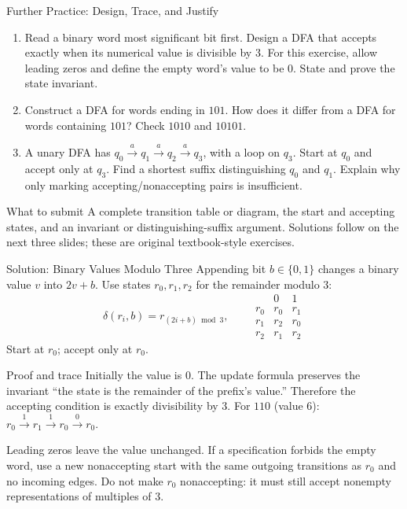\documentclass[10pt]{beamer}
\begin{document}
\begin{frame}{Further Practice: Design, Trace, and Justify}
  \small
  \begin{enumerate}
    \item Read a binary word most significant bit first. Design a DFA that
      accepts exactly when its numerical value is divisible by $3$.
      For this exercise, allow leading zeros and define the empty word's
      value to be $0$. State and prove the state invariant.
    \pause
    \item Construct a DFA for words ending in $101$. How does it differ
      from a DFA for words containing $101$? Check $1010$ and $10101$.
    \pause
    \item A unary DFA has $q_0\xrightarrow{a}q_1\xrightarrow{a}q_2
      \xrightarrow{a}q_3$, with a loop on $q_3$. Start at $q_0$ and accept
      only at $q_3$. Find a shortest suffix distinguishing $q_0$ and $q_1$.
      Explain why only marking accepting/nonaccepting pairs is insufficient.
  \end{enumerate}
  \begin{block}{What to submit}
    A complete transition table or diagram, the start and accepting states,
    and an invariant or distinguishing-suffix argument. Solutions follow on
    the next three slides; these are original textbook-style exercises.
  \end{block}
\end{frame}

\begin{frame}{Solution: Binary Values Modulo Three}
  \small
  Appending bit $b\in\{0,1\}$ changes a binary value $v$ into $2v+b$.
  Use states $r_0,r_1,r_2$ for the remainder modulo $3$:
  \[
    \delta(r_i,b)=r_{(2i+b)\bmod3},\qquad
    \begin{array}{c|cc}
      &0&1\\\hline
      r_0&r_0&r_1\\
      r_1&r_2&r_0\\
      r_2&r_1&r_2
    \end{array}
  \]
  Start at $r_0$; accept only at $r_0$.
  \pause
  \begin{block}{Proof and trace}
    Initially the value is $0$. The update formula preserves the invariant
    ``the state is the remainder of the prefix's value.'' Therefore the
    accepting condition is exactly divisibility by $3$.
    For $110$ (value $6$):
    $r_0\xrightarrow{1}r_1\xrightarrow{1}r_0\xrightarrow{0}r_0$.
  \end{block}
  \pause
  Leading zeros leave the value unchanged. If a specification forbids the
  empty word, use a new nonaccepting start with the same outgoing transitions
  as $r_0$ and no incoming edges. Do not make $r_0$ nonaccepting: it must
  still accept nonempty representations of multiples of $3$.
\end{frame}
\end{document}
